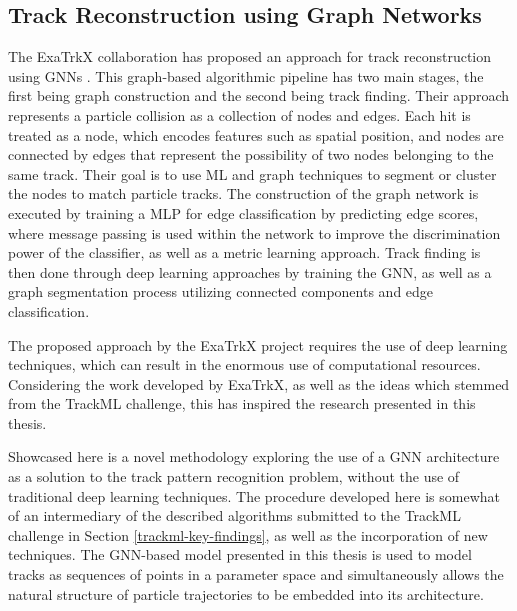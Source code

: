 \subsection{Track Reconstruction using Graph Networks}
\label{track-recon-graph-networks}

The ExaTrkX collaboration \cite{ExaTrkX-website} has proposed an approach for track reconstruction using GNNs \cite{Caillou:2815578}. This graph-based algorithmic pipeline has two main stages, the first being graph construction and the second being track finding. Their approach represents a particle collision as a collection of nodes and edges. Each hit is treated as a node, which encodes features such as spatial position, and nodes are connected by edges that represent the possibility of two nodes belonging to the same track. Their goal is to use ML and graph techniques to segment or cluster the nodes to match particle tracks. The construction of the graph network is executed by training a MLP for edge classification by predicting edge scores, where message passing is used within the network to improve the discrimination power of the classifier, as well as a metric learning approach. Track finding is then done through deep learning approaches by training the GNN, as well as a graph segmentation process utilizing connected components and edge classification.

The proposed approach by the ExaTrkX project requires the use of deep learning techniques, which can result in the enormous use of computational resources. Considering the work developed by ExaTrkX, as well as the ideas which stemmed from the TrackML challenge, this has inspired the research presented in this thesis. 

Showcased here is a novel methodology exploring the use of a GNN architecture as a solution to the track pattern recognition problem, without the use of traditional deep learning techniques. The procedure developed here is somewhat of an intermediary of the described algorithms submitted to the TrackML challenge in Section \ref{trackml-key-findings}, as well as the incorporation of new techniques. The GNN-based model presented in this thesis is used to model tracks as sequences of points in a parameter space and simultaneously allows the natural structure of particle trajectories to be embedded into its architecture. 

